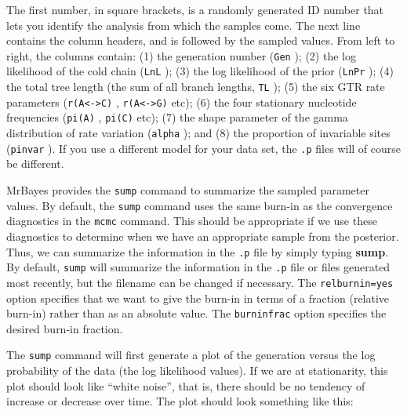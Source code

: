 \documentclass[12pt]{book}
\newcommand{\ttt}[1]{\texttt{#1} }
\begin{document}
The first number, in square brackets, is a randomly generated ID number that lets you identify the
analysis from which the samples come. The next line contains the column headers, and is followed by
the sampled values. From left to right, the columns contain: (1) the generation number
(\ttt{Gen}); (2) the log likelihood of the cold chain (\ttt{LnL}); (3) the log likelihood of
the prior (\ttt{LnPr});
(4) the total tree length (the sum of all branch lengths, \ttt{TL}); (5) the six GTR rate
parameters (\ttt{r(A<->C)}, \ttt{r(A<->G)} etc); (6) the four stationary nucleotide
frequencies (\ttt{pi(A)}, \ttt{pi(C)} etc); (7) the shape parameter of the gamma distribution
of rate variation (\ttt{alpha}); and (8) the proportion of invariable sites (\ttt{pinvar}).
If you use a different model for your data set, the \ttt{.p} files will of course be different.

MrBayes provides the \ttt{sump} command to summarize the sampled parameter values. By default,
the \ttt{sump} command uses the same burn-in as the convergence diagnostics in the \ttt{mcmc}
command.  This should be appropriate if we use these diagnostics to determine when we have an
appropriate sample from the posterior. Thus, we can summarize the information in the \ttt{.p}
file by simply typing \textbf{sump}. By default, \ttt{sump} will summarize the information in
the \ttt{.p} file or files generated most recently, but the filename can be changed if
necessary. The \ttt{relburnin=yes} option specifies that we want to give the burn-in in terms of
a fraction (relative burn-in) rather than as an absolute value. The \ttt{burninfrac} option
specifies the desired burn-in fraction.

The \ttt{sump} command will first generate a plot of the generation versus the log probability
of the data (the log likelihood values). If we are at stationarity, this plot should look like
``white noise'', that is, there should be no tendency of increase or decrease over time. The plot
should look something like this:
\end{document}
